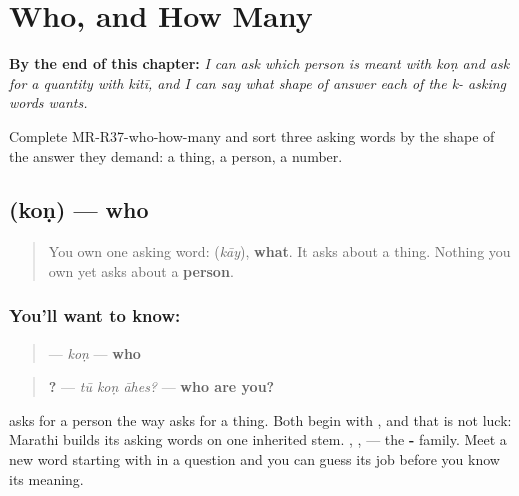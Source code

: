 
\chapter{Who, and How Many}
\label{ch:mr-who-how-many}

\begin{chapteropening}
\textbf{By the end of this chapter:} \emph{I can ask which person is meant with koṇ and ask for a quantity with kitī, and I can say what shape of answer each of the k- asking words wants.}

Complete MR-R37-who-how-many and sort three asking words by the shape of the answer they demand: a thing, a person, a number.
\end{chapteropening}

\section[\texorpdfstring{\mr{कोण} (koṇ)}{कोण (koṇ)}]{ (koṇ) — who}

\label{lesson:MR-C37-kon}



\begin{quote}
You own one asking word: \textbf{} (\emph{kāy}), \textbf{what}. It asks about a thing. Nothing you own yet asks about a \textbf{person}.
\end{quote}

\subsection*{You'll want to know: }
\begin{quote}
\textbf{} — \emph{koṇ} — \textbf{who}
\end{quote}

\begin{quote}
\textbf{  ?} — \emph{tū koṇ āhes?} — \textbf{who are you?}
\end{quote}

\textbf{} asks for a person the way \textbf{} asks for a thing. Both begin with \textbf{}, and that is not luck: Marathi builds its asking words on one inherited stem. \textbf{}, \textbf{}, \textbf{} — the \textbf{-} family. Meet a new word starting with \textbf{} in a question and you can guess its job before you know its meaning.

